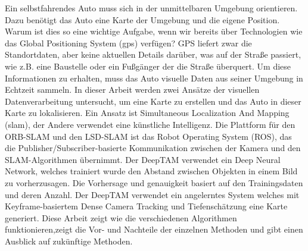 Ein selbstfahrendes Auto muss sich in der unmittelbaren Umgebung orientieren. Dazu benötigt das Auto eine Karte der Umgebung und die eigene Position. Warum ist dies so eine wichtige Aufgabe, wenn wir bereits über Technologien wie das Global Positioning System (\gls{gps}) verfügen? GPS liefert zwar die Standortdaten, aber keine aktuellen Details darüber, was auf der Straße passiert, wie z.B. eine Baustelle oder ein Fußgänger der die Straße überquert. Um diese Informationen zu erhalten, muss das Auto visuelle Daten aus seiner Umgebung in Echtzeit sammeln. In dieser Arbeit werden zwei Ansätze der visuellen Datenverarbeitung untersucht, um eine Karte zu erstellen und das Auto in dieser Karte zu lokalisieren. Ein Ansatz ist Simultaneous Localization And Mapping (\gls{slam}), der Andere verwendet eine künstliche Intelligenz. Die Plattform für den ORB-SLAM und den LSD-SLAM ist das Robot Operating System (ROS), das die Publisher/Subscriber-basierte Kommunikation zwischen der Kamera und den SLAM-Algorithmen übernimmt. Der DeepTAM verwendet ein Deep Neural Network, welches trainiert wurde den Abstand zwischen Objekten in einem Bild zu vorherzusagen. Die Vorhersage und genauigkeit basiert auf den Trainingsdaten und deren Anzahl. Der DeepTAM verwendet ein angelerntes System welches mit Keyframe-basiertem Dense Camera Tracking und Tiefenschätzung eine Karte generiert. Diese Arbeit zeigt wie die verschiedenen Algorithmen funktionieren,zeigt die Vor- und Nachteile der einzelnen Methoden und gibt einen Ausblick auf zukünftige Methoden.

 

